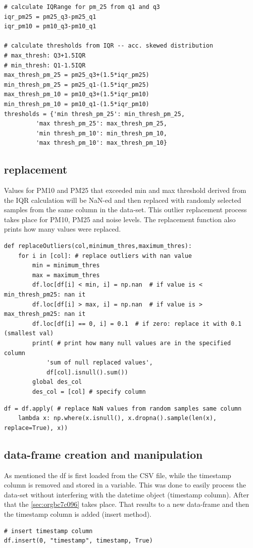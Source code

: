 \documentclass[11pt]{article}
\begin{document}
\begin{verbatim}
# calculate IQRange for pm_25 from q1 and q3
iqr_pm25 = pm25_q3-pm25_q1
iqr_pm10 = pm10_q3-pm10_q1

# calculate thresholds from IQR -- acc. skewed distribution
# max_thresh: Q3+1.5IQR
# min_thresh: Q1-1.5IQR
max_thresh_pm_25 = pm25_q3+(1.5*iqr_pm25)
min_thresh_pm_25 = pm25_q1-(1.5*iqr_pm25)
max_thresh_pm_10 = pm10_q3+(1.5*iqr_pm10)
min_thresh_pm_10 = pm10_q1-(1.5*iqr_pm10)
thresholds = {'min thresh_pm_25': min_thresh_pm_25,
         'max thresh_pm_25': max_thresh_pm_25,
         'min thresh_pm_10': min_thresh_pm_10,
         'max thresh_pm_10': max_thresh_pm_10}
\end{verbatim}

\subsection{replacement}
\label{sec:orga15dfa1}
Values for PM10 and PM25 that exceeded min and max threshold derived from the IQR calculation will be NaN-ed and then replaced with randomly selected samples from the same column in the data-set.  This outlier replacement process takes place for PM10, PM25 and noise levels.  The replacement function also prints how many values were replaced.

\begin{verbatim}
def replaceOutliers(col,minimum_thres,maximum_thres):
    for i in [col]: # replace outliers with nan value
        min = minimum_thres
        max = maximum_thres
        df.loc[df[i] < min, i] = np.nan  # if value is < min_thresh_pm25: nan it
        df.loc[df[i] > max, i] = np.nan  # if value is > max_thresh_pm25: nan it
        df.loc[df[i] == 0, i] = 0.1  # if zero: replace it with 0.1 (smallest val)
        print( # print how many null values are in the specified column
            'sum of null replaced values',
            df[col].isnull().sum())
        global des_col
        des_col = [col] # specify column
\end{verbatim}

\begin{verbatim}
df = df.apply( # replace NaN values from random samples same column
    lambda x: np.where(x.isnull(), x.dropna().sample(len(x), replace=True), x))
\end{verbatim}

\subsection{data-frame creation and manipulation}
\label{sec:org35cbb08}
As mentioned the df is first loaded from the CSV file, while the timestamp column is removed and stored in a variable.  This was done to easily process the data-set without interfering with the datetime object (timestamp column).  After that the \ref{sec:orgbc7c096} takes place.  That results to a new data-frame and then the timestamp column is added (insert method).
\begin{verbatim}
# insert timestamp column
df.insert(0, "timestamp", timestamp, True)
\end{verbatim}
\end{document}
